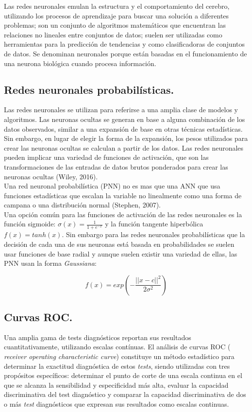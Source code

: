Las redes neuronales emulan la estructura y el comportamiento del cerebro, utilizando los procesos de aprendizaje para buscar una solución a diferentes problemas; son un conjunto de algoritmos matemáticos que encuentran las relaciones no lineales entre conjuntos de datos; suelen ser utilizadas como herramientas para la predicción de tendencias y como clasificadoras de conjuntos de datos. Se denominan neuronales porque están basadas en el funcionamiento de una neurona biológica cuando procesa información.

\subsection{Redes neuronales probabilísticas.}

Las redes neuronales se utilizan para referirse a una amplia clase de modelos y algoritmos. Las neuronas ocultas se generan en base a alguna combinación de los datos observados, similar a una expansión de base en otras técnicas estadísticas. Sin embargo, en lugar de elegir la forma de la expansión, los pesos utilizados para crear las neuronas ocultas se calculan a partir de los datos. Las redes neuronales pueden implicar una variedad de funciones de activación, que son las transformaciones de las entradas de datos brutos ponderados para crear las neuronas ocultas (Wiley, 2016).\\

Una red neuronal probabilística (PNN) no es mas que una ANN que usa funciones estadísticas que escalan la variable no linealmente como una forma de campana o una distribución normal (Stephen, 2007).\\

Una opción común para las funciones de activación de las redes neuronales es la función sigmoide: $\sigma\left(x\right)=\frac{1}{1+e^{-x}}$ y la función tangente hiperbólica $f\left(x\right)=tanh(x)$. Sin embargo para las redes neuronales probabilísticas que la decisión de cada una de sus neuronas está basada en probabilidades se suelen usar funciones de base radial y aunque suelen existir una variedad de ellas, las PNN usan la forma \textit{Gaussiana}: 

\[
 f\left(x\right) = exp(-\frac{|| x-c ||^2}{2\sigma^{2}})
 \]

\subsection{Curvas ROC.}

Una amplia gama de tests diagnósticos reportan sus resultados cuantitativamente, utilizando escalas contínuas. El análisis de curvas ROC ( \textit{receiver operating characteristic curve}) constituye un método estadístico para determinar la exactitud diagnóstica de estos \textit{tests}, siendo utilizadas con tres propósitos específicos: determinar el punto de corte de una escala continua en el que se alcanza la sensibilidad y especificidad más alta, evaluar la capacidad discriminativa del test diagnóstico y comparar la capacidad discriminativa de dos o más \textit{test} diagnósticos que expresan sus resultados como escalas continuas.

